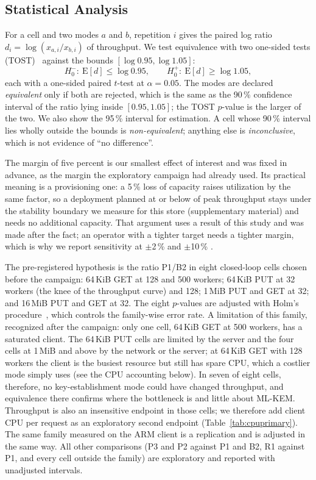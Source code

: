 \documentclass[conference]{IEEEtran}
\begin{document}
\subsection{Statistical Analysis}\label{sec:tost}\label{sec:cpumethod}\label{sec:deviations}
For a cell and two modes $a$ and $b$, repetition $i$ gives the paired log ratio
$d_i=\log(x_{a,i}/x_{b,i})$ of throughput. We test equivalence with two one-sided tests
(TOST)~\cite{schuirmann1987,dixon2018} against the bounds $[\log 0.95,\log 1.05]$:
\[H_0^{-}:\ \mathrm{E}[d]\le\log 0.95,\qquad H_0^{+}:\ \mathrm{E}[d]\ge\log 1.05,\]
each with a one-sided paired $t$-test at $\alpha=0.05$. The modes are declared \emph{equivalent}
only if both are rejected, which is the same as the 90\,\% confidence interval of the ratio lying
inside $[0.95,1.05]$; the TOST $p$-value is the larger of the two. We also show the 95\,\%
interval for estimation. A cell whose 90\,\% interval lies wholly outside the bounds is
\emph{non-equivalent}; anything else is \emph{inconclusive}, which is not evidence of ``no
difference''.

The margin of five percent is our smallest effect of interest and was fixed in advance, as the
margin the exploratory campaign had already used. Its practical meaning is a provisioning one: a
5\,\% loss of capacity raises utilization by the same factor, so a deployment planned at or
below \RevMarginUtil{} of peak throughput stays under the stability boundary we measure for
this store (supplementary material) and needs no additional capacity. That argument uses a result of this
study and was made after the fact; an operator with a tighter target needs a tighter margin,
which is why we report sensitivity at $\pm$2\,\% and $\pm$10\,\%
\cite{lakens2017}.

The pre-registered hypothesis is the ratio P1/B2 in eight
closed-loop cells chosen before the campaign: 64\,KiB GET at 128 and 500 workers; 64\,KiB PUT at
32 workers (the knee of the throughput curve) and 128; 1\,MiB PUT and GET at 32; and 16\,MiB PUT
and GET at 32. The eight $p$-values are adjusted with Holm's procedure~\cite{holm1979}, which
controls the family-wise error rate. A limitation of this family, recognized after the
campaign: only one cell, 64\,KiB GET at 500 workers, has a saturated client. The 64\,KiB PUT
cells are limited by the server and the four cells at 1\,MiB and above by the network or the
server; at 64\,KiB GET with 128 workers the client is the busiest resource but still has spare
CPU, which a costlier mode simply uses (see the CPU accounting below). In seven of eight cells,
therefore, no key-establishment mode could have changed throughput, and equivalence there
confirms where the bottleneck is and little about ML-KEM. Throughput is also
an insensitive endpoint in those cells; we therefore add client CPU per request as an
exploratory second endpoint (Table~\ref{tab:cpuprimary}). The same family measured on the ARM client is a replication
and is adjusted in the same way. All other comparisons (P3 and P2 against P1 and B2, R1 against
P1, and every cell outside the family) are exploratory and reported with unadjusted intervals.
\end{document}

